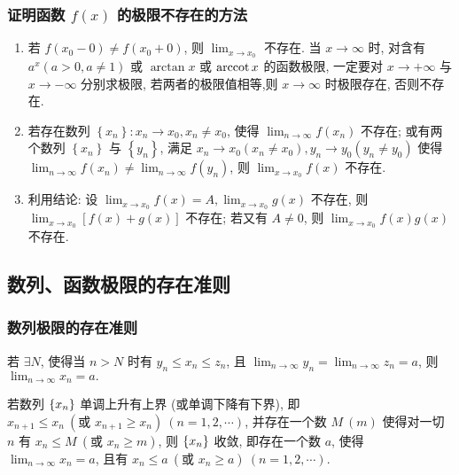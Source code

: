\subsubsection{证明函数 $ f(x) $ 的极限不存在的方法}

\begin{enumerate}[label=(\arabic{*})]
    \item 若 $ f\left(x_{0}-0\right) \neq f\left(x_{0}+0\right)$, 则 $\displaystyle \lim _{x \to x_{0}} $ 不存在. 当 $ x \to \infty $ 时, 对含有 $ a^{x}(a>0, a \neq 1) $ 或 $ \arctan x $ 或 $ \arccot x $ 的函数极限, 一定要对 $ x \to+\infty $ 与 $ x \to-\infty $ 分别求极限, 若两者的极限值相等,则 $ x \to \infty $ 时极限存在, 否则不存在.
    \item 若存在数列 $ \left\{x_{n}\right\}: x_{n} \to x_{0}, x_{n} \neq x_{0} $, 使得 $\displaystyle \lim _{n \to \infty} f\left(x_{n}\right) $ 不存在; 或有两个数列 $ \left\{x_{n}\right\} $ 与 $ \left\{y_{n}\right\} $, 满足 $ x_{n} \to x_{0}\left(x_{n} \neq x_{0}\right), y_{n} \to y_{0}\left(y_{n} \neq y_{0}\right) $ 使得 $ \displaystyle\lim _{n \to \infty} f\left(x_{n}\right) \neq \lim _{n \to \infty} f\left(y_{n}\right) $, 则 $ \displaystyle\lim _{x \to x_{0}} f(x) $ 不存在.
    \item 利用结论: 设 $\displaystyle \lim _{x \to x_{0}} f(x)=A, \lim _{x \to x_{0}} g(x) $ 不存在, 则 $\displaystyle \lim _{x \to x_{0}}[f(x)+g(x)] $ 不存在; 若又有 $ A \neq 0 $, 则 $ \displaystyle\lim _{x \to x_{0}} f(x) g(x) $ 不存在.
\end{enumerate}

\subsection{数列、函数极限的存在准则}

\subsubsection{数列极限的存在准则}

\begin{theorem}[数列的夹逼准则]
    \label{pinchGuidelines}
    若 $\exists N$, 使得当 $n>N$ 时有 $y_n\leqslant x_n\leqslant z_n$, 且 $\displaystyle\lim_{n\to\infty}y_n=\lim_{n\to\infty}z_n=a$, 则 $\displaystyle\lim_{n\to\infty}x_n=a.$
\end{theorem}

\begin{theorem}[数列的单调有界准则]
    若数列 $\qty{x_n}$ 单调上升有上界 (或单调下降有下界), 即 $x_{n+1}\leqslant x_n~(\text{或 }x_{n+1}\geqslant x_n)~(n=1,2,\cdots)$, 并存在一个数 $M~ (m)$ 使得对一切 $n$ 有 $x_n\leqslant M~(\text{或 }x_n\geqslant m)$, 则 $\qty{x_n}$ 收敛, 即存在一个数 $a$, 使得 $\displaystyle\lim_{n\to\infty}x_n=a$, 且有 $x_n\leqslant a~(\text{或 }x_n\geqslant a)~(n=1,2,\cdots)$.
\end{theorem}

